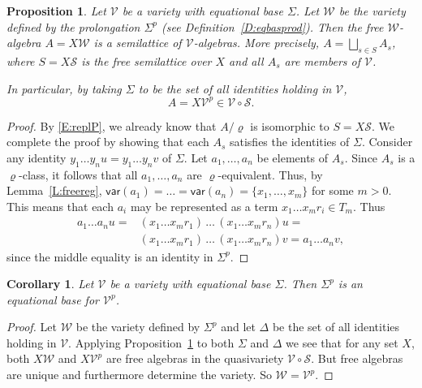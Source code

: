 \documentclass{birkau}
\newcommand{\mcV}{\mathcal{V}}
\newcommand{\mcW}{\mathcal{W}}
\newcommand{\mcS}{\mathcal{S}}
\def\mf{\mathsf}
\newcommand{\pro}[1]{{#1}^p}
\theoremstyle{plain}
\newtheorem{corollary}[theorem]{Corollary}
\newtheorem{proposition}[theorem]{Proposition}
\theoremstyle{definition}
\numberwithin{equation}{section}
\begin{document}
\begin{proposition}\label{P:freetp}
  Let $\mcV$ be a variety with equational base $\Sigma$. Let $\mcW$ be the variety defined
  by the prolongation $\pro{\Sigma}$ (see Definition~\ref{D:eqbasprod}). Then the free
  $\mcW$-algebra  $A=X\mcW$ is a semilattice
of $\mcV$-algebras. More precisely, $A = \bigsqcup_{s \in S} A_s $, where $S = X\mcS$ is
the free semilattice over $X$ and all $A_s$ are members of $\mcV$.

In particular, by taking $\Sigma$ to be the set of all identities holding in $\mcV$,
\begin{equation*}
  A = X\pro{\mcV} \in \mcV \circ \mcS.
\end{equation*}
\end{proposition}


\begin{proof}
  By \eqref{E:replP}, we already know that $A/\varrho$ is isomorphic to $S = X\mcS$. We
  complete the proof by showing that each $A_s$ satisfies the identities of
  $\Sigma$. Consider any identity $y_1 \dots y_n u = y_1 \dots y_n v$ of $\Sigma$. Let
  $a_1, \ldots, a_n$ be elements of $A_s$. Since $A_s$ is a $\varrho$-class, it follows
  that all $a_1, \ldots, a_n$ are $\varrho$-equivalent. Thus, by Lemma~\ref{L:freereg},
  $\mf{var}(a_1) = \dots = \mf{var}(a_n) = \{x_1,\dots, x_m\}$ for some $m>0$. This means
  that each $a_i$ may be represented as a term
  $x_1 \dots x_m r_i \in T_m$. Thus
  \begin{align*}
    a_1 \dots a_n u = &(x_1 \dots x_m r_1) \, \ldots \, (x_1 \dots x_m r_{n}) u =\\
    &(x_1 \dots x_m r_{1}) \, \ldots \, (x_1 \dots x_m r_{n}) v =
    a_1  \dots a_n v,
  \end{align*}
  since the middle equality is an identity in $\Sigma^p$.
\end{proof}


\begin{corollary}\label{C:vp_base}
  Let $\mcV$ be a variety with equational base $\Sigma$. Then $\pro{\Sigma}$ is an
  equational base for $\pro{\mcV}$.
\end{corollary}

\begin{proof}
  Let $\mcW$ be the variety defined by $\pro{\Sigma}$ and let $\Delta$ be the set of all
  identities holding in $\mcV$. Applying Proposition~\ref{P:freetp} to both $\Sigma$ and
  $\Delta$ we see that for any set $X$, both $X\mcW$ and $X\pro{\mcV}$ are free algebras
  in the quasivariety $\mcV \circ \mcS$. But free algebras are unique and furthermore
  determine the variety. So $\mcW = \pro{\mcV}$.
\end{proof}
\end{document}
